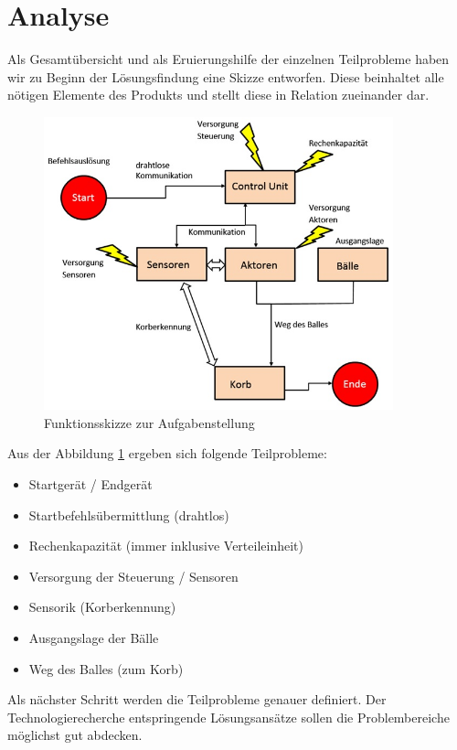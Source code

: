 \section{Analyse}
	Als Gesamtübersicht und als Eruierungshilfe der einzelnen Teilprobleme haben wir zu Beginn der Lösungsfindung eine Skizze entworfen. Diese beinhaltet alle nötigen Elemente des Produkts und stellt diese in Relation zueinander dar. 
	
	\begin{figure}[h!]
		\includegraphics[width=0.9\textwidth]{Morphologie/Bilder/Blockschaltbild.jpg}
		\centering
		\caption{Funktionsskizze zur Aufgabenstellung}
		\label{abb:Blockschaltbild} 
	\end{figure}
	
	Aus der Abbildung \ref{abb:Blockschaltbild} ergeben sich folgende Teilprobleme:
	\begin{itemize}
		\item Startgerät / Endgerät
		\item Startbefehlsübermittlung (drahtlos)
		\item Rechenkapazität (immer inklusive Verteileinheit)
		\item Versorgung der Steuerung / Sensoren
		\item Sensorik (Korberkennung)
		\item Ausgangslage der Bälle
		\item Weg des Balles (zum Korb)
	\end{itemize}
	Als nächster Schritt werden die Teilprobleme genauer definiert. Der Technologierecherche entspringende Lösungsansätze sollen die Problembereiche möglichst gut abdecken.
	
